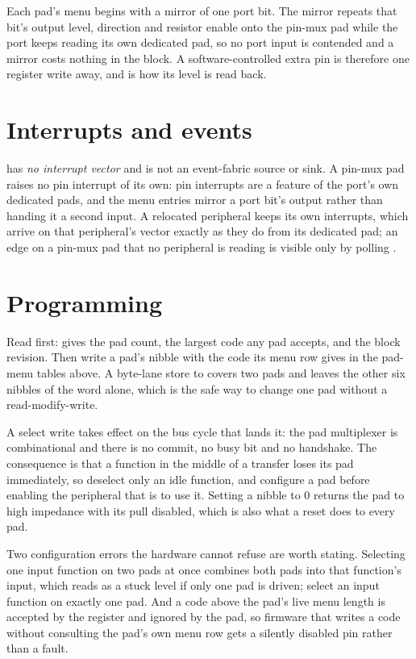 Each pad's menu begins with a mirror of one  port bit. The mirror repeats that bit's output level, direction and resistor enable onto the pin-mux pad while the port keeps reading its own dedicated pad, so no port input is contended and a mirror costs nothing in the  block. A software-controlled extra pin is therefore one register write away, and  is how its level is read back.

\section{Interrupts and events}

 has \emph{no interrupt vector} and is not an event-fabric source or sink. A pin-mux pad raises no pin interrupt of its own: pin interrupts are a  feature of the port's own dedicated pads, and the  menu entries mirror a port bit's output rather than handing it a second input. A relocated peripheral keeps its own interrupts, which arrive on that peripheral's vector exactly as they do from its dedicated pad; an edge on a pin-mux pad that no peripheral is reading is visible only by polling .

\section{Programming}

Read  first:  gives the pad count,  the largest code any pad accepts, and  the block revision. Then write a pad's nibble with the code its menu row gives in the pad-menu tables above. A byte-lane store to  covers two pads and leaves the other six nibbles of the word alone, which is the safe way to change one pad without a read-modify-write.

A select write takes effect on the bus cycle that lands it: the pad multiplexer is combinational and there is no commit, no busy bit and no handshake. The consequence is that a function in the middle of a transfer loses its pad immediately, so deselect only an idle function, and configure a pad before enabling the peripheral that is to use it. Setting a nibble to 0 returns the pad to high impedance with its pull disabled, which is also what a reset does to every pad.

Two configuration errors the hardware cannot refuse are worth stating. Selecting one input function on two pads at once combines both pads into that function's input, which reads as a stuck level if only one pad is driven; select an input function on exactly one pad. And a code above the pad's live menu length is accepted by the register and ignored by the pad, so firmware that writes a code without consulting the pad's own menu row gets a silently disabled pin rather than a fault.

